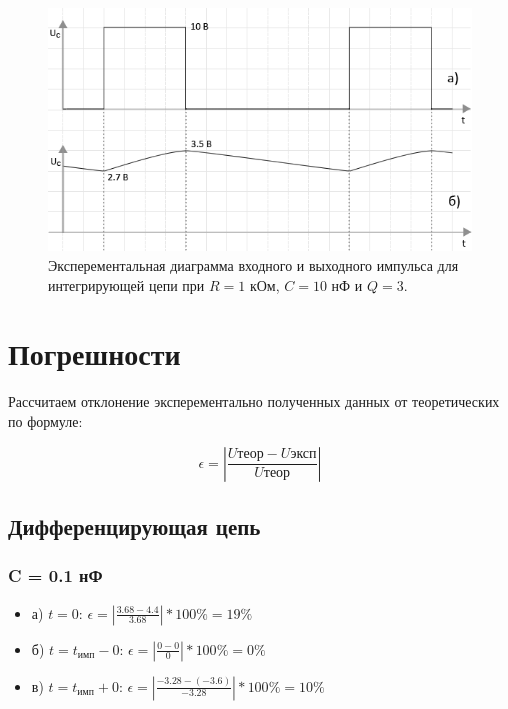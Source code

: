 \begin{figure}[H]
	\begin{center}
		\includegraphics[width=14cm]{img/q3}
		\caption{Эксперементальная диаграмма входного и выходного импульса для интегрирующей цепи при $R = 1$ кОм, $C = 10$ нФ и $Q = 3$.}
		\label{i:3} %
	\end{center}
\end{figure}

\section{Погрешности}

Рассчитаем отклонение эксперементально полученных данных от теоретических по формуле:

\begin{equation}
		\epsilon = |\frac{U\text{теор}-U\text{эксп}}{U\text{теор}}|
\end{equation}

\subsection{Дифференцирующая цепь}
\subsubsection{C = 0.1 нФ}
\begin{itemize}
\item[] а) $t = 0$: $\epsilon = |\frac{3.68 - 4.4}{ 3.68 }| * 100\% = 19 \%$

\item[] б) $t = t_\text{имп} - 0$: $\epsilon = |\frac{0 - 0}{ 0 }| * 100\% = 0 \%$

\item[] в) $t = t_\text{имп} + 0$: $\epsilon = |\frac{-3.28 - (-3.6)}{ -3.28 }| * 100\% = 10 \%$ 
\end{itemize}

